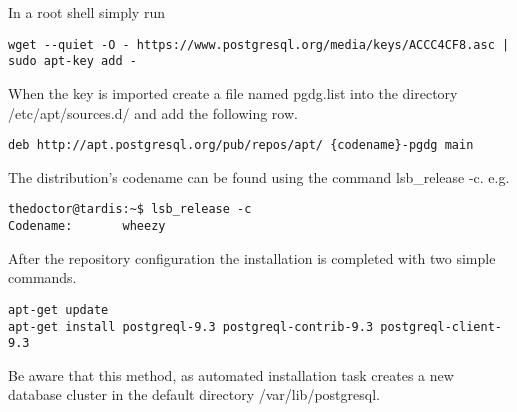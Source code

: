 In a root shell simply run
\begin{verbatim}
wget --quiet -O - https://www.postgresql.org/media/keys/ACCC4CF8.asc | sudo apt-key add -
\end{verbatim}
When the key is imported create a file named pgdg.list into the directory /etc/apt/sources.d/ and
add the following row.

\begin{verbatim}
deb http://apt.postgresql.org/pub/repos/apt/ {codename}-pgdg main
\end{verbatim}


The distribution's codename can be found using the command lsb\_release -c.
e.g.
\begin{verbatim}
thedoctor@tardis:~$ lsb_release -c
Codename:       wheezy
\end{verbatim}

After the repository configuration the installation is completed with two simple commands.

\begin{verbatim}
apt-get update
apt-get install postgreql-9.3 postgreql-contrib-9.3 postgreql-client-9.3
\end{verbatim}

Be aware that this method, as automated installation task creates a new database cluster in
the default directory /var/lib/postgresql.

